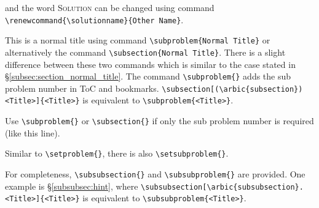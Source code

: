 \documentclass[twoside]{seu-ml-assign}
\begin{document}
    \startsolution[print]
    and the word \textsc{Solution} can be changed using command \verb|\renewcommand{\solutionname}{Other Name}|.



     This is a normal title using command \verb|\subproblem{Normal Title}| or alternatively the command \verb|\subsection{Normal Title}|.
    There is a slight difference between these two commands which is similar to the case stated in \S\ref{subsec:section_normal_title}.
    The command
    \verb|\subproblem{}| adds the sub problem number in ToC and bookmarks.
    \verb|\subsection[(\arbic{subsection}) <Title>]{<Title>}|
    is equivalent to \verb|\subproblem{<Title>}|.

    \subproblem{} Use \verb|\subproblem{}| or \verb|\subsection{}| if only the sub problem number is required (like this line).

     Similar to \verb|\setproblem{}|, there is also \verb|\setsubproblem{}|.

     For completeness,
    \verb|\subsubsection{}| and \verb|\subsubproblem{}| are provided.
    One example is \S\ref{subsubsec:hint}, where
    \verb|\subsubsection[\arbic{subsubsection}. <Title>]{<Title>}|
    is equivalent to \verb|\subsubproblem{<Title>}|.

\end{document}
